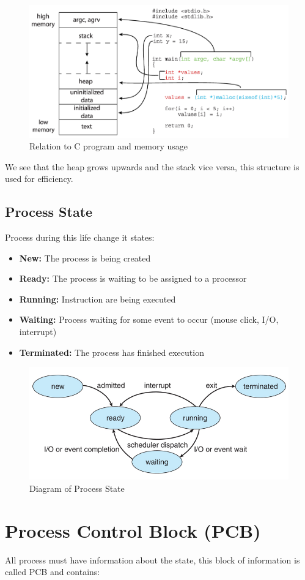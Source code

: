 \begin{figure}[htbp]
    \centering
    \includegraphics[width=0.7\linewidth]{img/memory_c_program.png}
    \caption{Relation to C program and memory usage}    
\end{figure}

We see that the heap grows upwards and the stack vice versa, this structure is used for efficiency. 

\subsection{Process State}
Process during this life change it states:

\begin{itemize}
    \item \textbf{New:} The process is being created
    \item \textbf{Ready:} The process is waiting to be assigned to a processor
    \item \textbf{Running:} Instruction are being executed
    \item \textbf{Waiting:} Process waiting for some event to occur (mouse click, I/O, interrupt)    
    \item \textbf{Terminated:} The process has finished execution
\end{itemize}


\begin{figure}[htbp]
    \centering
    \includegraphics[width=0.6\linewidth]{img/process_state_diagram.png}
    \caption{Diagram of Process State}    
\end{figure}

\section{Process Control Block (PCB)}
All process must have information about the state, this block of information is called PCB and contains:

